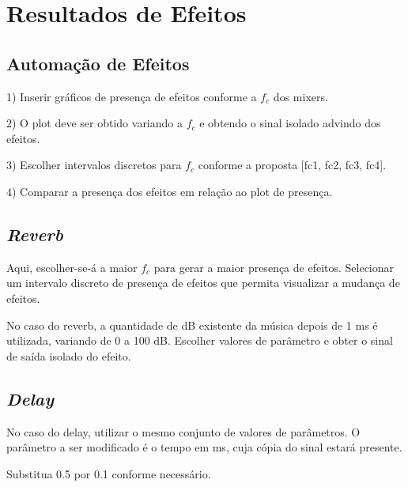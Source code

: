 \newpage
\newpage
\section{Resultados de Efeitos}

\subsection{Automação de Efeitos}

1) Inserir gráficos de presença de efeitos conforme a $f_c$ dos mixers.

2) O plot deve ser obtido variando a $f_c$ e obtendo o sinal isolado advindo dos efeitos.

3) Escolher intervalos discretos para $f_c$ conforme a proposta [fc1, fc2, fc3, fc4].

4) Comparar a presença dos efeitos em relação ao plot de presença.

\subsection{\textit{Reverb}}

Aqui, escolher-se-á a maior $f_c$ para gerar a maior presença de efeitos. Selecionar um intervalo discreto de presença de efeitos que permita visualizar a mudança de efeitos.

No caso do reverb, a quantidade de dB existente da música depois de 1 ms é utilizada, variando de 0 a 100 dB. Escolher valores de parâmetro e obter o sinal de saída isolado do efeito.

\subsection{\textit{Delay}}

No caso do delay, utilizar o mesmo conjunto de valores de parâmetros. O parâmetro a ser modificado é o tempo em ms, cuja cópia do sinal estará presente.

Substitua 0.5 por 0.1 conforme necessário.
